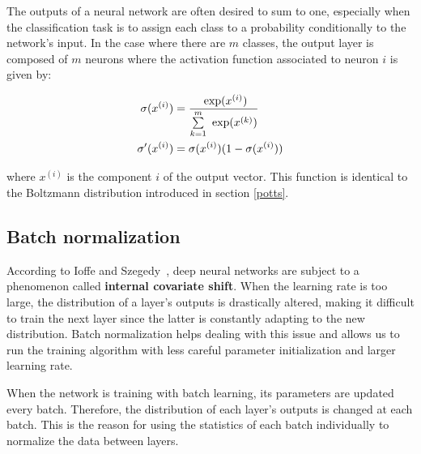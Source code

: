         The outputs of a neural network are often desired to sum to one, especially when the classification task is to assign each class to a probability
        conditionally to the network's input. In the case where there are $m$ classes, the output layer is composed of $m$ neurons where the activation
        function associated to neuron $i$ is given by:

        \begin{equation}
            \begin{split}
                \sigma(x^{(i)}) & = \frac{\text{ exp}(x^{(i)})}{\sum\limits_{k=1}^m \text{ exp}(x^{(k)})} \\
                \sigma'(x^{(i)}) & = \sigma(x^{(i)}) (1 - \sigma(x^{(i)}))
            \end{split}
        \end{equation}

        where $x^{(i)}$ is the component $i$ of the output vector.
        This function is identical to the Boltzmann distribution introduced in section \ref{potts}.


    \subsection{Batch normalization} \label{batchnorm}

        According to Ioffe and Szegedy~\cite{DBLP:journals/corr/IoffeS15}, deep neural networks are subject to a phenomenon
        called \textbf{internal covariate shift}. When the learning rate is too large, the distribution of a layer's outputs
        is drastically altered, making it difficult to train the next layer since the latter is constantly adapting to the new
        distribution. Batch normalization helps dealing with this issue and allows us to run the training algorithm with less
        careful parameter initialization and larger learning rate.

        When the network is training with batch learning, its parameters are updated every batch. Therefore, the distribution
        of each layer's outputs is changed at each batch. This is the reason for using the statistics of each batch individually
        to normalize the data between layers.

